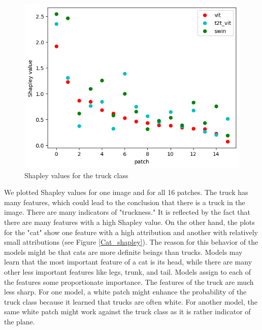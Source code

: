 \documentclass[magisterska,en]{pracamgr}
\begin{document}
\begin{figure}[H]
\centering
\includegraphics[scale=0.5]{./images/Truck_shapley.png}
\caption{Shapley values for the truck class}
\label{Truck_shapley}
\end{figure}

We plotted Shapley values for one image and for all 16 patches. The truck has many features, which could lead to the conclusion that there is a truck in the image. There are many indicators of "truckness." It is reflected by the fact that there are many features with a high Shapley value. On the other hand, the plots for the "cat" show one feature with a high attribution and another with relatively small attributions (see Figure \ref{Cat_shapley}). The reason for this behavior of the models might be that cats are more definite beings than trucks. Models may learn that the most important feature of a cat is its head, while there are many other less important features like legs, trunk, and tail. Models assign to each of the features some proportionate importance. The features of the truck are much less sharp. For one model, a white patch might enhance the probability of the truck class because it learned that trucks are often white. For another model, the same white patch might work against the truck class as it is rather indicator of the plane.
\end{document}
